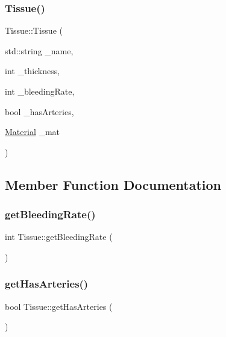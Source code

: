 \mbox{\label{class_tissue_a5a8ebbf389afa45e53a846fa2e638ea9}} 
\subsubsection{\texorpdfstring{Tissue()}{Tissue()}\hspace{0.1cm}{\footnotesize\ttfamily [3/3]}}
{\footnotesize\ttfamily Tissue\+::\+Tissue (\begin{DoxyParamCaption}\item[{std\+::string}]{\+\_\+name,  }\item[{int}]{\+\_\+thickness,  }\item[{int}]{\+\_\+bleeding\+Rate,  }\item[{bool}]{\+\_\+has\+Arteries,  }\item[{\mbox{\hyperlink{class_material}{Material}}}]{\+\_\+mat }\end{DoxyParamCaption})}



\subsection{Member Function Documentation}
\mbox{\label{class_tissue_a7748299a10804751740a36797bee74c3}} 
\subsubsection{\texorpdfstring{get\+Bleeding\+Rate()}{getBleedingRate()}}
{\footnotesize\ttfamily int Tissue\+::get\+Bleeding\+Rate (\begin{DoxyParamCaption}{ }\end{DoxyParamCaption})}

\mbox{\label{class_tissue_afb6756f17cfc812b4d2b99a12a0efacb}} 
\subsubsection{\texorpdfstring{get\+Has\+Arteries()}{getHasArteries()}}
{\footnotesize\ttfamily bool Tissue\+::get\+Has\+Arteries (\begin{DoxyParamCaption}{ }\end{DoxyParamCaption})}

